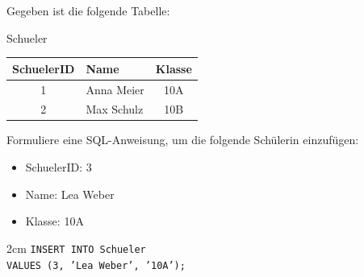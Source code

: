 \question[3]
Gegeben ist die folgende Tabelle:

 Schueler \medskip
 
\begin{tabular}{|c|l|c|}
\hline
SchuelerID & Name & Klasse \\
\hline
1 & Anna Meier & 10A \\
2 & Max Schulz & 10B \\
\hline
\end{tabular}
 

Formuliere eine SQL-Anweisung, um die folgende Schülerin einzufügen:

\begin{itemize}
\item SchuelerID: 3
\item Name: Lea Weber
\item Klasse: 10A
\end{itemize}

\begin{solutionbox}{2cm}
\texttt{INSERT INTO Schueler}\\
\texttt{VALUES (3, 'Lea Weber', '10A');}
\end{solutionbox}